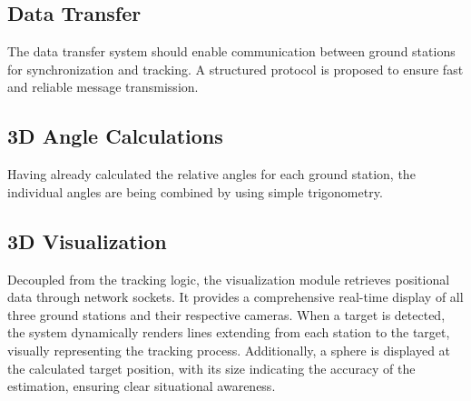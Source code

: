 
\subsection{Data Transfer}

The data transfer system should enable communication between ground stations for synchronization and tracking. A structured protocol is proposed to ensure fast and reliable message transmission.

\subsection{3D Angle Calculations}
Having already calculated the relative angles for each ground station, the individual angles are being combined by using simple trigonometry. 



\subsection{3D Visualization}
Decoupled from the tracking logic, the visualization module retrieves positional data through network sockets. It provides a comprehensive real-time display of all three ground stations and their respective cameras. When a target is detected, the system dynamically renders lines extending from each station to the target, visually representing the tracking process. Additionally, a sphere is displayed at the calculated target position, with its size indicating the accuracy of the estimation, ensuring clear situational awareness.
